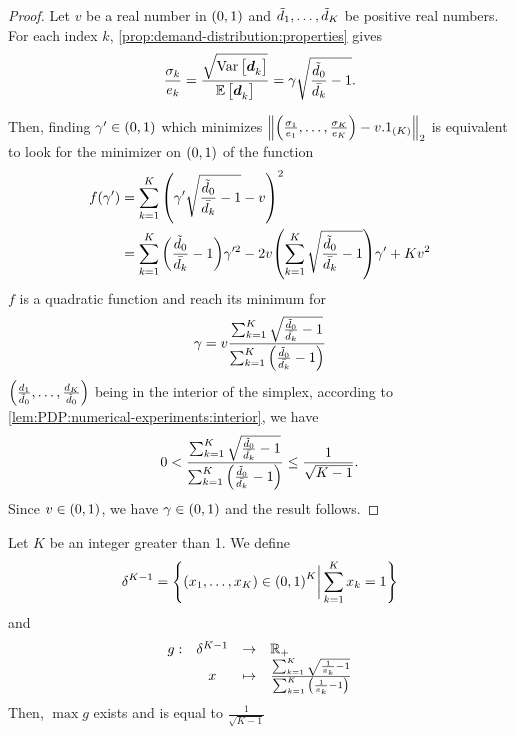 \begin{proof}
Let $v$ be a real number in $\bracket{0,1}$ and $\tilde{d}_1,\ldots,\tilde{d}_K$ be positive real numbers.
For each index $k$, \cref{prop:demand-distribution:properties} gives
\begin{equation}
  \frac{\sigma_k}{e_k}
  = \frac{\sqrt{\vari\sqbracket{\va\demand_k}}}{\espe\sqbracket{\va\demand_k}}
  = \gamma\sqrt{\frac{\tilde{\demand}_0}{\bar{\demand_k}}-1}.
\end{equation}

Then, finding $\gamma'\in\bracket{0,1}$ which minimizes $\norm{\bracket{\frac{\sigma_1}{e_1},\ldots,\frac{\sigma_K}{e_K}}-v.1_{(K)}}_2$ is equivalent to look for the minimizer on $\bracket{0,1}$ of the function
\begin{subequations}
\begin{align}
  f\bracket{\gamma'}
  &= \sum_{k=1}^K \bracket{\gamma'\sqrt{\frac{\tilde{\demand}_0}{\bar{\demand_k}}-1}-v}^2
  \\
  &= \sum_{k=1}^K\bracket{\frac{\tilde{\demand}_0}{\bar{\demand_k}}-1}\gamma'^2
  - 2v\bracket{\sum_{k=1}^K\sqrt{\frac{\tilde{\demand}_0}{\bar{\demand_k}}-1}}\gamma'
  + K v^2
\end{align}
\end{subequations}
$f$ is a quadratic function and reach its minimum for
\begin{equation}
  \gamma
  =
  v\frac
  {\sum_{k=1}^K\sqrt{\frac{\tilde{\demand}_0}{\bar{\demand_k}}-1}}
  {\sum_{k=1}^K\bracket{\frac{\tilde{\demand}_0}{\bar{\demand_k}}-1}}
\end{equation}
$\bracket{\frac{\demand_1}{\tilde{\demand}_0},\ldots,\frac{\demand_K}{\tilde{\demand}_0}}$ being in the interior of the simplex, according to \cref{lem:PDP:numerical-experiments:interior}, we have
\begin{equation}
  0 <
  \frac
  {\sum_{k=1}^K\sqrt{\frac{\tilde{\demand}_0}{\bar{\demand_k}}-1}}
  {\sum_{k=1}^K\bracket{\frac{\tilde{\demand}_0}{\bar{\demand_k}}-1}}
  \le
  \frac{1}{\sqrt{K-1}}.
\end{equation}
Since $v\in\bracket{0,1}$, we have $\gamma\in\bracket{0,1}$ and the result follows.
\end{proof}



\begin{lem}\label{lem:PDP:numerical-experiments:interior}
Let $K$ be an integer greater than 1.
We define
\begin{equation}
  \delta^{K-1} = \crbracket{\bracket{x_1,\ldots,x_K}\in\bracket{0,1}^K \bigg| \sum_{k=1}^K x_k = 1}
\end{equation}
and
\begin{equation}
  \begin{array}{rccl}
  g: & \delta^{K-1} & \rightarrow & \RR_+ \\
     & x & \mapsto & \frac{\sum_{k=1}^K\sqrt{\frac{1}{x_k}-1}}{\sum_{k=1}^K\bracket{\frac{1}{x_k}-1}}
  \end{array}
\end{equation}
Then, $\max g$ exists and is equal to $\frac{1}{\sqrt{K-1}}$
\end{lem}


